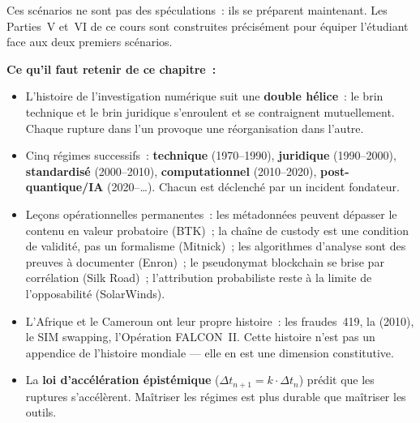 \medskip

Ces scénarios ne sont pas des spéculations~: ils se préparent maintenant.
Les Parties~V et~VI de ce cours sont construites précisément pour équiper
l'étudiant face aux deux premiers scénarios.

\separateur

\begin{boxresume}
\textbf{Ce qu'il faut retenir de ce chapitre~:}

\begin{itemize}
    \item L'histoire de l'investigation numérique suit une
          \textbf{double hélice}~: le brin technique et le brin juridique
          s'enroulent et se contraignent mutuellement. Chaque rupture dans
          l'un provoque une réorganisation dans l'autre.

    \item Cinq régimes successifs~: \textbf{technique} (1970--1990),
          \textbf{juridique} (1990--2000), \textbf{standardisé} (2000--2010),
          \textbf{computationnel} (2010--2020), \textbf{post-quantique/IA}
          (2020--\ldots). Chacun est déclenché par un incident fondateur.

    \item Leçons opérationnelles permanentes~: les métadonnées peuvent
          dépasser le contenu en valeur probatoire (BTK)~; la chaîne de
          custody est une condition de validité, pas un formalisme
          (Mitnick)~; les algorithmes d'analyse sont des preuves à documenter
          (Enron)~; le pseudonymat blockchain se brise par corrélation
          (Silk Road)~; l'attribution probabiliste reste à la limite de
          l'opposabilité (SolarWinds).

    \item L'Afrique et le Cameroun ont leur propre histoire~: les fraudes~419,
          la  (2010), le SIM swapping, l'Opération FALCON~II.
          Cette histoire n'est pas un appendice de l'histoire mondiale --- elle
          en est une dimension constitutive.

    \item La \textbf{loi d'accélération épistémique}
          ($\Delta t_{n+1} = k \cdot \Delta t_n$) prédit que les ruptures
          s'accélèrent. Maîtriser les régimes est plus durable que maîtriser
          les outils.
\end{itemize}
\end{boxresume}

\bigskip

